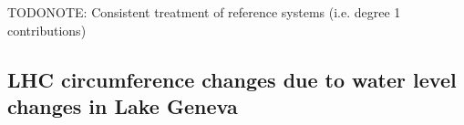 \documentclass[a4paper,10pt,twoside,openany]{article}
\begin{document}
TODONOTE: Consistent treatment of reference systems (i.e. degree 1 contributions)











\subsection{LHC circumference changes due to water level changes in Lake Geneva}



%
%
\end{document}
